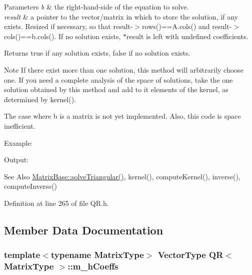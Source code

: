\begin{DoxyParams}{Parameters}
{\em b} & the right-\/hand-\/side of the equation to solve.\\
\hline
{\em result} & a pointer to the vector/matrix in which to store the solution, if any exists. Resized if necessary, so that result-\/$>$rows()==A.\-cols() and result-\/$>$cols()==b.\-cols(). If no solution exists, $\ast$result is left with undefined coefficients.\\
\hline
\end{DoxyParams}
\begin{DoxyReturn}{Returns}
true if any solution exists, false if no solution exists.
\end{DoxyReturn}
\begin{DoxyNote}{Note}
If there exist more than one solution, this method will arbitrarily choose one. If you need a complete analysis of the space of solutions, take the one solution obtained by this method and add to it elements of the kernel, as determined by kernel().

The case where b is a matrix is not yet implemented. Also, this code is space inefficient.
\end{DoxyNote}
Example\-:
\begin{DoxyCodeInclude}
\end{DoxyCodeInclude}
 Output\-:
\begin{DoxyVerbInclude}
\end{DoxyVerbInclude}


\begin{DoxySeeAlso}{See Also}
\hyperlink{class_matrix_base_aa338f29b37898b2104b39c32b6854a65}{Matrix\-Base\-::solve\-Triangular()}, kernel(), compute\-Kernel(), inverse(), compute\-Inverse() 
\end{DoxySeeAlso}


Definition at line 265 of file Q\-R.\-h.



\subsection{Member Data Documentation}
\hypertarget{class_q_r_a30cc8665a2b668c899eb94a37b464682}{
\subsubsection[{m\-\_\-h\-Coeffs}]{\setlength{\rightskip}{0pt plus 5cm}template$<$typename Matrix\-Type$>$ {\bf Vector\-Type} {\bf Q\-R}$<$ Matrix\-Type $>$\-::m\-\_\-h\-Coeffs\hspace{0.3cm}{\ttfamily [protected]}}}\label{class_q_r_a30cc8665a2b668c899eb94a37b464682}


